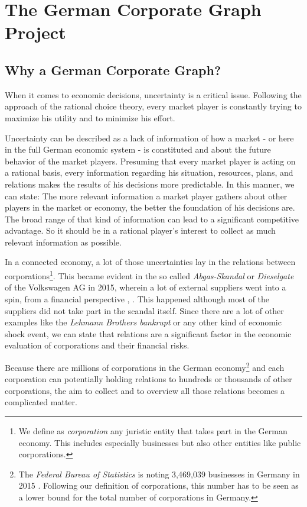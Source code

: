 \section{The German Corporate Graph Project}
\label{sec_project}

\subsection{Why a German Corporate Graph?}

When it comes to economic decisions, uncertainty is a critical issue. Following the approach of the rational choice theory, every market player is constantly trying to maximize his utility and to minimize his effort.

Uncertainty can be described as a lack of information of how a market - or here in the full German economic system - is constituted and about the future behavior of the market players. Presuming that every market player is acting on a rational basis, every information regarding his situation, resources, plans, and relations makes the results of his decisions more predictable. In this manner, we can state: The more relevant information a market player gathers about other players in the market or economy, the better the foundation of his decisions are. The broad range of that kind of information can lead to a significant competitive advantage. So it should be in a rational player's interest to collect as much relevant information as possible.
\medskip

In a connected economy, a lot of those uncertainties lay in the relations between corporations\footnote{We define as \emph{corporation} any juristic entity that takes part in the German economy. This includes especially businesses but also other entities like public corporations.}. This became evident in the so called \emph{Abgas-Skandal} or \emph{Dieselgate} of the Volkswagen AG in 2015, wherein a lot of external suppliers went into a spin, from a financial perspective \cite{stuttzeit}, \cite{automobilwoche}. This happened although most of the suppliers did not take part in the scandal itself. Since there are a lot of other examples like the \emph{Lehmann Brothers bankrupt} or any other kind of economic shock event, we can state that relations are a significant factor in the economic evaluation of corporations and their financial risks.
\medskip

Because there are millions of corporations in the German economy\footnote{ The \emph{Federal Bureau of Statistics} is noting 3,469,039 businesses in Germany in 2015 \cite{destatis1}. Following our definition of corporations, this number has to be seen as a lower bound for the total number of corporations in Germany.} and each corporation can potentially holding relations to hundreds or thousands of other corporations, the aim to collect and to overview all those relations becomes a complicated matter.
\medskip

